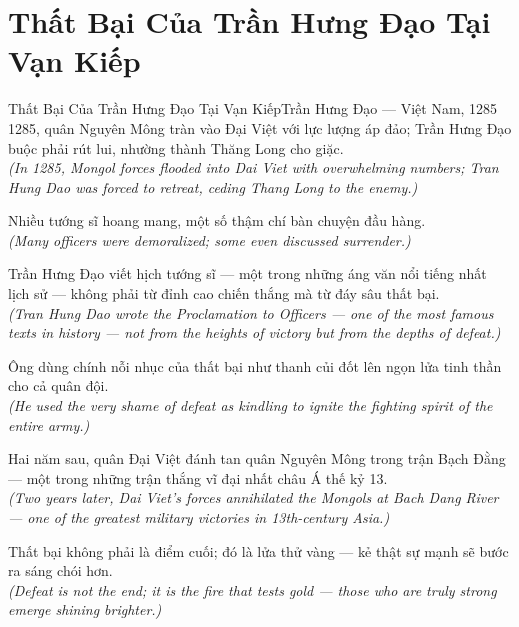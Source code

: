 \section{Thất Bại Của Trần Hưng Đạo Tại Vạn Kiếp}
\begin{truyen}{Thất Bại Của Trần Hưng Đạo Tại Vạn Kiếp}{Trần Hưng Đạo --- Việt Nam, 1285}
 1285, quân Nguyên Mông tràn vào Đại Việt với lực lượng áp đảo; Trần Hưng Đạo buộc phải rút lui, nhường thành Thăng Long cho giặc.\\[4pt]
\textit{(In 1285, Mongol forces flooded into Dai Viet with overwhelming numbers; Tran Hung Dao was forced to retreat, ceding Thang Long to the enemy.)}

Nhiều tướng sĩ hoang mang, một số thậm chí bàn chuyện đầu hàng.\\[4pt]
\textit{(Many officers were demoralized; some even discussed surrender.)}

Trần Hưng Đạo viết hịch tướng sĩ --- một trong những áng văn nổi tiếng nhất lịch sử --- không phải từ đỉnh cao chiến thắng mà từ đáy sâu thất bại.\\[4pt]
\textit{(Tran Hung Dao wrote the Proclamation to Officers --- one of the most famous texts in history --- not from the heights of victory but from the depths of defeat.)}

Ông dùng chính nỗi nhục của thất bại như thanh củi đốt lên ngọn lửa tinh thần cho cả quân đội.\\[4pt]
\textit{(He used the very shame of defeat as kindling to ignite the fighting spirit of the entire army.)}

Hai năm sau, quân Đại Việt đánh tan quân Nguyên Mông trong trận Bạch Đằng --- một trong những trận thắng vĩ đại nhất châu Á thế kỷ 13.\\[4pt]
\textit{(Two years later, Dai Viet's forces annihilated the Mongols at Bach Dang River --- one of the greatest military victories in 13th-century Asia.)}

\end{truyen}
\begin{baihoc}
  Thất bại không phải là điểm cuối; đó là lửa thử vàng --- kẻ thật sự mạnh sẽ bước ra sáng chói hơn.\\[4pt]
  \textit{(Defeat is not the end; it is the fire that tests gold --- those who are truly strong emerge shining brighter.)}
\end{baihoc}

